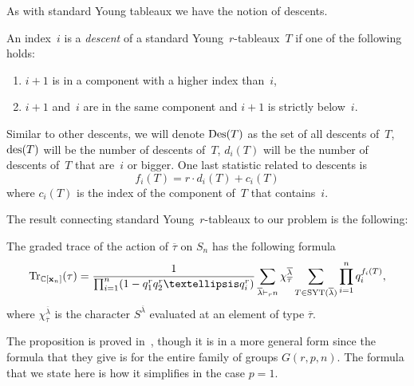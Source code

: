 \documentclass[10pt]{article}
\newcommand{\Tr}{\operatorname{Tr}}\newcommand{\rev}{\operatorname{rev}}
\begin{document}
	As with standard Young tableaux we have the notion of descents.

	\begin{defi}

		An index~$i$ is a \emph{descent} of a standard Young~$r$-tableaux~$T$ if one of the following holds:

		\begin{enumerate}
			
			\item $i+1$ is in a component with a higher index than~$i$,

			\item $i+1$ and~$i$ are in the same component and $i+1$ is strictly below~$i$.

		\end{enumerate}
		
		Similar to other descents, we will denote $\operatorname{Des} (T)$ as the set of all descents of~$T$, $\operatorname{des} (T)$ will be the number of 
descents of~$T$, $d_i(T)$ will be the number of descents of~$T$ that are~$i$ or bigger. One last statistic related 
to descents is
\begin{equation}
f_i(T)=r\cdot d_i(T)+c_i(T)
\end{equation}
 where $c_i(T)$ is the index of the component of~$T$ that contains~$i$. 
	\end{defi}

The result connecting standard Young~$r$-tableaux to our problem is the following:

	\begin{prop}
	\label{BBProp}
		The graded trace of the action of $\overline{\tau}$ on $S_n$ has the following formula 
		\begin{equation}
		\Tr _{\mathbb{C}[\mathbf{x}_n]}(\tau)=\frac{1}{\prod_{i=1}^n(1-q_1^rq_2^r\ldots 
q_i^r)}\sum_{\overline{\lambda}\vdash_r n}\chi_{\overline{\tau}}^{\overline{\lambda}}\sum_{T\in 
\SYT (\overline{\lambda})}\prod_{i=1}^{n} q_i^{f_i(T)},
\end{equation}
		where $\chi_{\overline{\tau}}^{\overline{\lambda}}$ is the character $S^{\overline{\lambda}}$ evaluated at an element 
of type $\overline{\tau}$.

	\end{prop}

The proposition is proved in~\cite{BB}, though it is in a more general form since the formula that they give is for the entire 
family of groups $G(r,p,n)$. The formula that we state here is how it simplifies in the case $p=1$.
\end{document}
